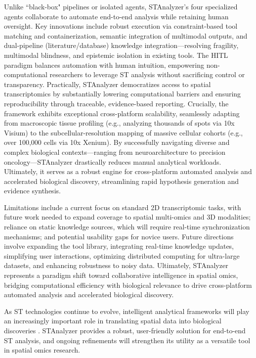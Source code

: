 \documentclass[11pt,a4paper]{article}
\begin{document}
Unlike ``black-box" pipelines or isolated agents, STAnalyzer’s four specialized agents collaborate to automate end-to-end analysis while retaining human oversight. Key innovations include robust execution via constraint-based tool matching and containerization, semantic integration of multimodal outputs, and dual-pipeline (literature/database) knowledge integration—resolving fragility, multimodal blindness, and epistemic isolation in existing tools. The HITL paradigm balances automation with human intuition, empowering non-computational researchers to leverage ST analysis without sacrificing control or transparency. Practically, STAnalyzer democratizes access to spatial transcriptomics by substantially lowering computational barriers and ensuring reproducibility through traceable, evidence-based reporting. Crucially, the framework exhibits exceptional cross-platform scalability, seamlessly adapting from macroscopic tissue profiling (e.g., analyzing thousands of spots via 10x Visium) to the subcellular-resolution mapping of massive cellular cohorts (e.g., over 100,000 cells via 10x Xenium). By successfully navigating diverse and complex biological contexts—ranging from neuroarchitecture to precision oncology—STAnalyzer drastically reduces manual analytical workloads. Ultimately, it serves as a robust engine for cross-platform automated analysis and accelerated biological discovery, streamlining rapid hypothesis generation and evidence synthesis.

Limitations include a current focus on standard 2D transcriptomic tasks, with future work needed to expand coverage to spatial multi-omics and 3D modalities; reliance on static knowledge sources, which will require real-time synchronization mechanisms; and potential usability gaps for novice users. Future directions involve expanding the tool library, integrating real-time knowledge updates, simplifying user interactions, optimizing distributed computing for ultra-large datasets, and enhancing robustness to noisy data. Ultimately, STAnalyzer represents a paradigm shift toward collaborative intelligence in spatial omics, bridging computational efficiency with biological relevance to drive cross-platform automated analysis and accelerated biological discovery.

As ST technologies continue to evolve, intelligent analytical frameworks will play an increasingly important role in translating spatial data into biological discoveries \cite{williams2022introduction}. STAnalyzer provides a robust, user-friendly solution for end-to-end ST analysis, and ongoing refinements will strengthen its utility as a versatile tool in spatial omics research.
\end{document}
